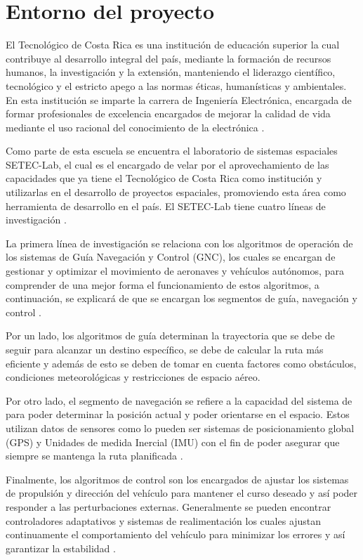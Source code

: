 \documentclass[12pt]{article}
\begin{document}
\newpage
\tableofcontents
\newpage

\section{Entorno del proyecto}
El Tecnológico de Costa Rica es una institución de educación superior la cual contribuye al desarrollo integral del país, mediante la formación de recursos humanos, la investigación y la extensión, manteniendo el liderazgo científico, tecnológico y el estricto apego a las normas éticas, humanísticas y ambientales. En esta institución se imparte la carrera de Ingeniería Electrónica, encargada de formar profesionales de excelencia encargados de mejorar la calidad de vida mediante el uso racional del conocimiento de la electrónica \cite{conare_itcr_mision}.

Como parte de esta escuela se encuentra el laboratorio de sistemas espaciales SETEC-Lab, el cual es el encargado de velar por el aprovechamiento de las capacidades que ya tiene el Tecnológico de Costa Rica como institución y utilizarlas en el desarrollo de proyectos espaciales, promoviendo esta área como herramienta de desarrollo en el país. El SETEC-Lab tiene cuatro líneas de investigación \cite{tec_setec_lab}. 

La primera línea de investigación se relaciona con los algoritmos de operación de los sistemas de Guía Navegación y Control (GNC), los cuales se encargan de gestionar y optimizar el movimiento de aeronaves y vehículos autónomos, para comprender de una mejor forma el funcionamiento de estos algoritmos, a continuación, se explicará de que se encargan los segmentos de guía, navegación y control \cite{moghaddam2021guidance}. 

Por un lado, los algoritmos de guía determinan la trayectoria que se debe de seguir para alcanzar un destino específico, se debe de calcular la ruta más eficiente y además de esto se deben de tomar en cuenta factores como obstáculos, condiciones meteorológicas y restricciones de espacio aéreo. 

Por otro lado, el segmento de navegación se refiere a la capacidad del sistema de para poder determinar la posición actual y poder orientarse en el espacio. Estos utilizan datos de sensores como lo pueden ser sistemas de posicionamiento global (GPS) y Unidades de medida Inercial (IMU) con el fin de poder asegurar que siempre se mantenga la ruta planificada \cite{Colmenarejo2024}. 

Finalmente, los algoritmos de control son los encargados de ajustar los sistemas de propulsión y dirección del vehículo para mantener el curso deseado y así poder responder a las perturbaciones externas. Generalmente se pueden encontrar controladores adaptativos y sistemas de realimentación los cuales ajustan continuamente el comportamiento del vehículo para minimizar los errores y así garantizar la estabilidad \cite{Balaram2008}.
 
\end{document}
